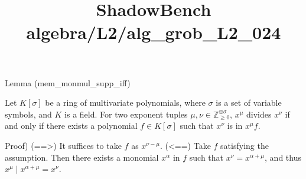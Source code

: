 \documentclass{article}
\title{ShadowBench algebra/L2/alg\_grob\_L2\_024}
\begin{document}
\maketitle

Lemma (mem_monmul_supp_iff)

Let $K[\sigma]$ be a ring of multivariate polynomials, where $\sigma$ is a set of variable symbols, and $K$ is a field. For two exponent tuples $\mu, \nu \in \mathbb{Z}_{\ge 0}^{\oplus \sigma}$, $x^\mu$ divides $x^\nu$ if and only if there exists a polynomial $f \in K[\sigma]$ such that $x^\nu$ is in $x^\mu f$.

Proof)
(==>) It suffices to take $f$ as $x^{\nu - \mu}$.
(<==) Take $f$ satisfying the assumption. Then there exists a monomial $x^\alpha$ in $f$ such that $x^\nu = x^{\alpha + \mu}$, and thus $x^\mu \mid x^{\alpha + \mu} = x^\nu$.
\end{document}
